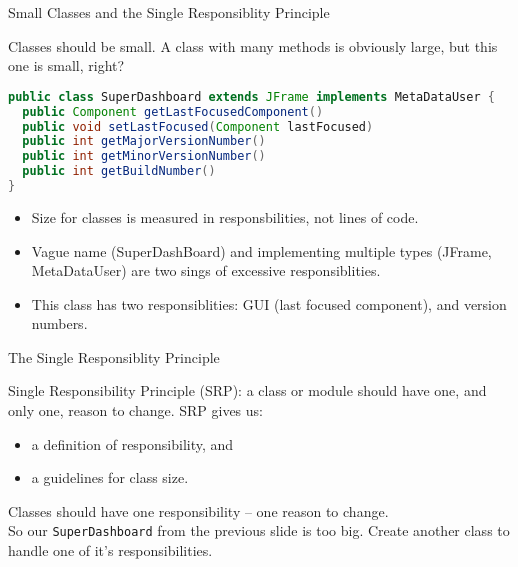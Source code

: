 \documentclass{beamer}
\begin{document}
\begin{frame}[fragile]{Small Classes and the Single Responsiblity Principle}


Classes should be small.  A class with many methods is obviously large, but this one is small, right?
\begin{lstlisting}[language=Java]
public class SuperDashboard extends JFrame implements MetaDataUser {
  public Component getLastFocusedComponent()
  public void setLastFocused(Component lastFocused)
  public int getMajorVersionNumber()
  public int getMinorVersionNumber()
  public int getBuildNumber()
}
\end{lstlisting}

\begin{itemize}
\item Size for classes is measured in responsbilities, not lines of code.
\item Vague name (SuperDashBoard) and implementing multiple types (JFrame, MetaDataUser) are two sings of excessive responsiblities.
\item This class has two responsiblities: GUI (last focused component), and version numbers. 
\end{itemize}

\end{frame}

\begin{frame}[fragile]{The Single Responsiblity Principle}


Single Responsibility Principle (SRP): a class or module should have one, and only one, reason to change. SRP gives us:
\begin{itemize}
\item a definition of responsibility, and
\item a guidelines for class size.
\end{itemize}
Classes should have one responsibility -- one reason to change.\\
\vspace{.1in}
So our {\tt SuperDashboard} from the previous slide is too big.  Create another class to handle one of it's responsibilities.
\end{frame}
\end{document}
